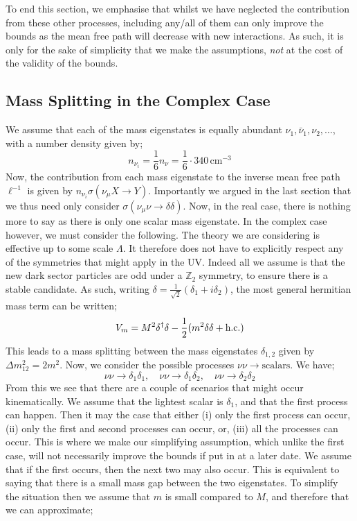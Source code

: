 To end this section, we emphasise that whilst we have neglected the contribution from these other processes, including any/all of them can only improve the bounds as the mean free path will decrease with new interactions. As such, it is only for the sake of simplicity that we make the assumptions, \textit{not} at the cost of the validity of the bounds.



\subsection{Mass Splitting in the Complex Case}\label{sec:complexsplit}



We assume that each of the mass eigenstates is equally abundant $\nu_1, \bar{\nu}_1, \nu_2, \ldots$, with a number density given by;
\begin{equation}
  n_{\nu_i} = \frac{1}{6} n_\nu = \frac{1}{6} \cdot 340 \, \textrm{cm}^{-3}
\end{equation}
Now, the contribution from each mass eigenstate to the inverse mean free path $\ell^{-1}$ is given by $n_{\nu_i} \sigma(\nu_\mu X \rightarrow Y )$. Importantly we argued in the last section that we thus need only consider $\sigma(\nu_\mu \nu \rightarrow \delta \delta)$. Now, in the real case, there is nothing more to say as there is only one scalar mass eigenstate. In the complex case however, we must consider the following. The theory we are considering is effective up to some scale $\Lambda$. It therefore does not have to explicitly respect any of the symmetries that might apply in the UV. Indeed all we assume is that the new dark sector particles are odd under a $\mathbb{Z}_2$ symmetry, to ensure there is a stable candidate. As such, writing $\delta = \tfrac{1}{\sqrt{2}}(\delta_1 + i \delta_2)$, the most general hermitian mass term can be written;
\begin{equation}
  V_m = M^2 \delta^{\dagger} \delta - \frac{1}{2}(m^2 \delta \delta + \textrm{h.c.})
\end{equation}
This leads to a mass splitting between the mass eigenstates $\delta_{1,2}$ given by $\Delta m_{12}^2 = 2m^2$. Now, we consider the possible processes $\nu\nu \rightarrow \textrm{scalars}$. We have;
\begin{equation*}
\nu\nu \rightarrow \delta_1 \delta_1, \quad \nu\nu \rightarrow \delta_1 \delta_2, \quad \nu\nu \rightarrow \delta_2 \delta_2
\end{equation*}
From this we see that there are a couple of scenarios that might occur kinematically. We assume that the lightest scalar is $\delta_1$, and that the first process can happen. Then it may the case that either (i) only the first process can occur, (ii) only the first and second processes can occur, or, (iii) all the processes can occur. This is where we make our simplifying assumption, which unlike the first case, will not necessarily improve the bounds if put in at a later date. We assume that if the first occurs, then the next two may also occur. This is equivalent to saying that there is a small mass gap between the two eigenstates. To simplify the situation then we assume that $m$ is small compared to $M$, and therefore that we can approximate;
